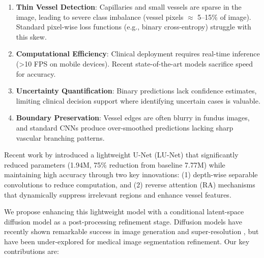 \documentclass[11pt]{article}
\begin{document}
\begin{enumerate}
    \item \textbf{Thin Vessel Detection}: Capillaries and small vessels are sparse in the image, leading to severe class imbalance (vessel pixels $\approx$ 5--15\% of image). Standard pixel-wise loss functions (e.g., binary cross-entropy) struggle with this skew.
    
    \item \textbf{Computational Efficiency}: Clinical deployment requires real-time inference (>10 FPS on mobile devices). Recent state-of-the-art models sacrifice speed for accuracy.
    
    \item \textbf{Uncertainty Quantification}: Binary predictions lack confidence estimates, limiting clinical decision support where identifying uncertain cases is valuable.
    
    \item \textbf{Boundary Preservation}: Vessel edges are often blurry in fundus images, and standard CNNs produce over-smoothed predictions lacking sharp vascular branching patterns.
\end{enumerate}

Recent work by \cite{LU2023} introduced a lightweight U-Net (LU-Net) that significantly reduced parameters (1.94M, 75\% reduction from baseline 7.77M) while maintaining high accuracy through two key innovations: (1) depth-wise separable convolutions to reduce computation, and (2) reverse attention (RA) mechanisms that dynamically suppress irrelevant regions and enhance vessel features.

We propose enhancing this lightweight model with a conditional latent-space diffusion model as a post-processing refinement stage. Diffusion models have recently shown remarkable success in image generation \cite{Ho2020,Dhariwal2021} and super-resolution \cite{Whang2023}, but have been under-explored for medical image segmentation refinement. Our key contributions are:
\end{document}
